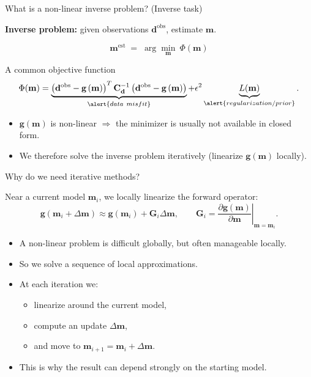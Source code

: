 \documentclass[aspectratio=169]{beamer}
\newcommand{\mat}[1]{{\mathbf{#1}}}
\renewcommand{\vec}[1]{\mathbf{#1}}
\newcommand{\dd}{ {\vec{d}} }
\newcommand{\dobs}{{\vec{d}^{\text{obs}}}}
\newcommand{\mm}{ {\vec{m}} }
\newcommand{\delm}{ {\Delta\mm} }
\newcommand{\mest}{ {\vec{m}^{\text{est}}} }
\renewcommand{\gg}[1]{\vec{g}\left(#1\right)}
\newcommand{\GG}{\mat{G}}
\newcommand{\Cd}{\mat{C}_{\dd}}
\begin{document}
\begin{frame}{What is a non-linear inverse problem? (Inverse task)}
\small

\textbf{Inverse problem:} given observations $\dobs$, estimate $\mm$.

\vspace{0.15cm}

\[
\mest \;=\; \arg\min_{\mm}\ \Phi(\mm)
\]

\vspace{-0.1cm}

\begin{block}{A common objective function}
\[
\Phi(\mm)
=
\underbrace{\left(\dobs-\gg{\mm}\right)^T \Cd^{-1}\left(\dobs-\gg{\mm}\right)}_{\alert{data\ misfit}}
+
\epsilon^2\underbrace{L(\mm)}_{\alert{regularization / prior}}.
\]
\end{block}

{
\vspace{0.1cm}
\begin{itemize}
  \item[--] $\gg{\mm}$ is \alert{non-linear} $\Rightarrow$ the minimizer is usually \alert{not available in closed form}.
  \item[--] We therefore solve the inverse problem \alert{iteratively} (linearize $\gg{\mm}$ locally).
\end{itemize}
}

\end{frame}

\begin{frame}{Why do we need iterative methods?}
\small

Near a current model $\mm_i$, we locally linearize the forward operator:
\[
\gg{\mm_i+\delm}
\approx
\gg{\mm_i} + \GG_i \delm,
\qquad
\GG_i = \left.\frac{\partial \gg{\mm}}{\partial \mm}\right|_{\mm=\mm_i}.
\]

{
\vspace{0.15cm}
\begin{itemize}
    \item[--] A non-linear problem is difficult globally, but often manageable \alert{locally}.
    \item[--] So we solve a sequence of \alert{local approximations}.
    \item[--] At each iteration we:
    \begin{itemize}
        \item[--] linearize around the current model,
        \item[--] compute an update $\delm$,
        \item[--] and move to $\mm_{i+1}=\mm_i+\delm$.
    \end{itemize}
    \item[--] This is why the result can depend strongly on the \alert{starting model}.
\end{itemize}
}
\end{frame}
\end{document}
